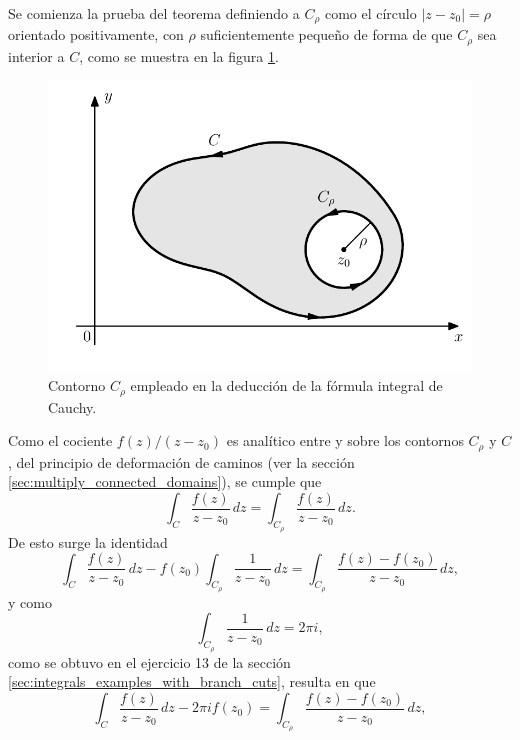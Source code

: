 \documentclass[a4paper]{report}
\begin{document}
Se comienza la prueba del teorema definiendo a \(C_\rho\) como el círculo \(|z-z_0|=\rho\) orientado positivamente, con \(\rho\) suficientemente pequeño de forma de que \(C_\rho\) sea interior a \(C\), como se muestra en la figura \ref{fig:cauchy_integral_formula}. 
\begin{figure}[!htb]
  \begin{minipage}[c]{0.6\textwidth}
    \includegraphics[width=\textwidth]{figuras/cauchy_integral_formula.pdf}
  \end{minipage}\hfill
  \begin{minipage}[c]{0.3\textwidth}
    \caption{
       Contorno \(C_\rho\) empleado en la deducción de la fórmula integral de Cauchy. 
    }\label{fig:cauchy_integral_formula}
  \end{minipage}
\end{figure}
Como el cociente \(f(z)/(z-z_0)\) es analítico entre y sobre los contornos \(C_\rho\) y \(C\), del principio de deformación de caminos (ver la sección \ref{sec:multiply_connected_domains}), se cumple que 
\[
 \int_C\frac{f(z)}{z-z_0}\,dz=\int_{C_\rho}\frac{f(z)}{z-z_0}\,dz.
\]
De esto surge la identidad
\[
 \int_C\frac{f(z)}{z-z_0}\,dz-f(z_0)\int_{C_\rho}\frac{1}{z-z_0}\,dz=\int_{C_\rho}\frac{f(z)-f(z_0)}{z-z_0}\,dz,
\]
y como 
\[
 \int_{C_\rho}\frac{1}{z-z_0}\,dz=2\pi i,
\]
como se obtuvo en el ejercicio 13 de la sección \ref{sec:integrals_examples_with_branch_cuts}, resulta en que  
\begin{equation}\label{eq:cauchy_integral_formula_deduction_tmp}
 \int_C\frac{f(z)}{z-z_0}\,dz-2\pi if(z_0)=\int_{C_\rho}\frac{f(z)-f(z_0)}{z-z_0}\,dz, 
\end{equation}
\end{document}

